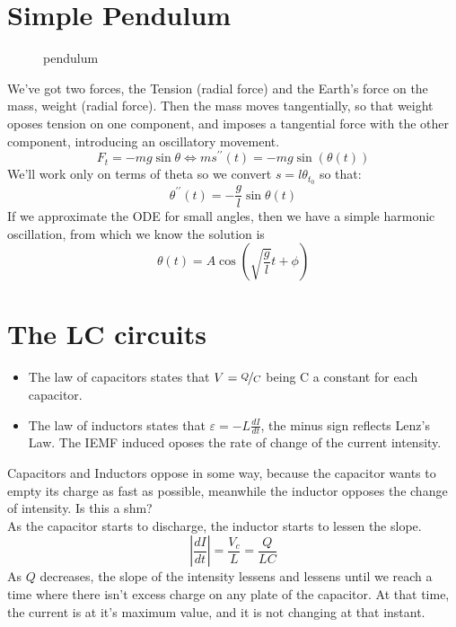 \documentclass{report}
\begin{document}
      \section{Simple Pendulum}
        \begin{figure}[h!]
          pendulum
        \end{figure}
        \noindent We've got two forces, the Tension (radial force) and the Earth's force on the mass, weight (radial force). Then the mass moves tangentially, so that weight oposes tension on one component, and imposes a tangential force with the other component, introducing an oscillatory movement.
        \[F_t=-mg\sin\theta\Longleftrightarrow ms^{\prime\prime}(t)=-mg\sin(\theta(t))\]
        We'll work only on terms of theta so we convert $s=l\theta_{t_0}$ so that:
        \[\theta^{\prime\prime}(t)=-\dfrac{g}{l}\sin{\theta}(t)\]
        If we approximate the ODE for small angles, then we have a simple harmonic oscillation, from which we know the solution is
        \begin{equation}
          \theta(t)=A\cos\left(\sqrt{\dfrac{g}{l}}t+\phi\right)
        \end{equation}
      \clearpage
      \section{The LC circuits}
        \begin{itemize}
          \item The law of capacitors states that $V=\nicefrac{Q}{C}$ being C a constant for each capacitor.
          \item The law of inductors states that $\varepsilon = -L\frac{dI}{dt}$, the minus sign reflects Lenz's Law. The IEMF induced oposes the rate of change of the current intensity.
        \end{itemize}

        \noindent Capacitors and Inductors oppose in some way, because the capacitor wants to empty its charge as fast as possible, meanwhile the inductor opposes the change of intensity. Is this a shm?\\

        \noindent As the capacitor starts to discharge, the inductor starts to lessen the slope.
        \[\left|\dfrac{dI}{dt}\right|=\dfrac{V_c}{L}=\dfrac{Q}{LC}\]
        \noindent As $Q$ decreases, the slope of the intensity lessens and lessens until we reach a time where there isn't excess charge on any plate of the capacitor. At that time, the current is at it's maximum value, and it is not changing at that instant.\\
\end{document}
